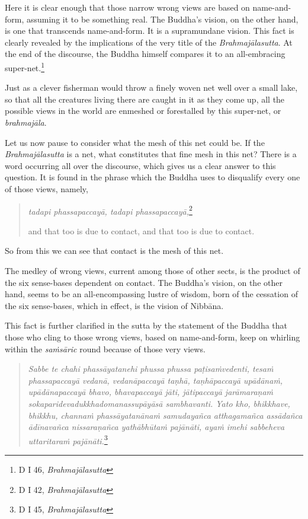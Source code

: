 Here it is clear enough that those narrow wrong views are based on name-and-form, assuming it to be something real. The Buddha's vision, on the other hand, is one that transcends name-and-form. It is a supramundane vision. This fact is clearly revealed by the implications of the very title of the \emph{Brahmajālasutta}. At the end of the discourse, the Buddha himself compares it to an all-embracing super-net.\footnote{D I 46, \emph{Brahmajālasutta}}

Just as a clever fisherman would throw a finely woven net well over a small lake, so that all the creatures living there are caught in it as they come up, all the possible views in the world are enmeshed or forestalled by this super-net, or \emph{brahmajāla}.

Let us now pause to consider what the mesh of this net could be. If the \emph{Brahmajālasutta} is a net, what constitutes that fine mesh in this net? There is a word occurring all over the discourse, which gives us a clear answer to this question. It is found in the phrase which the Buddha uses to disqualify every one of those views, namely,

\begin{quote}
\emph{tadapi phassapaccayā, tadapi phassapaccayā,}\footnote{D I 42, \emph{Brahmajālasutta}}

and that too is due to contact, and that too is due to contact.
\end{quote}

So from this we can see that contact is the mesh of this net.

The medley of wrong views, current among those of other sects, is the product of the six sense-bases dependent on contact. The Buddha's vision, on the other hand, seems to be an all-encompassing lustre of wisdom, born of the cessation of the six sense-bases, which in effect, is the vision of Nibbāna.

This fact is further clarified in the sutta by the statement of the Buddha that those who cling to those wrong views, based on name-and-form, keep on whirling within the \emph{saṁsāric} round because of those very views.

\begin{quote}
\emph{Sabbe te chahi phassāyatanehi phussa phussa paṭisaṁvedenti, tesaṁ phassapaccayā vedanā, vedanāpaccayā taṇhā, taṇhāpaccayā upādānaṁ, upādānapaccayā bhavo, bhavapaccayā jāti, jātipaccayā jarāmaraṇaṁ sokaparidevadukkhadomanassupāyāsā sambhavanti. Yato kho, bhikkhave, bhikkhu, channaṁ phassāyatanānaṁ samudayañca atthagamañca assādañca ādīnavañca nissaraṇañca yathābhūtaṁ pajānāti, ayaṁ imehi sabbeheva uttaritaraṁ pajānāti.}\footnote{D I 45, \emph{Brahmajālasutta}}
\end{quote}

